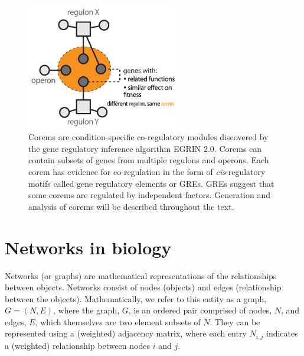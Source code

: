 \begin{figure}[h!]
    \centering
    \includegraphics[width=0.6\textwidth]{figures/corem}
 	\caption[Corem: subsets of operons and regulons regulated by multiple transcription factors]{
 	Corems are condition-specific co-regulatory modules discovered by the gene regulatory inference algorithm EGRIN 2.0. Corems can contain subsets of genes from multiple regulons and operons. Each corem has evidence for co-regulation in the form of \textit{cis}-regulatory motifs called gene regulatory elements or GREs. GREs suggest that some corems are regulated by independent factors. Generation and analysis of corems will be described throughout the text. 
}
    \label{fig:chap1:corem}
\end{figure}

\section{Networks in biology}

Networks (or graphs) are mathematical representations of the relationships between objects. Networks consist of nodes (objects) and edges (relationship between the objects). Mathematically, we refer to this entity as a graph, $G = (N,E)$, where the graph, $G$, is an ordered pair comprised of nodes, $N$, and edges, $E$, which themselves are two element subsets of $N$. They can be represented using a (weighted) adjacency matrix, where each entry $N_{i, j}$  indicates a (weighted) relationship between nodes $i$ and $j$.

